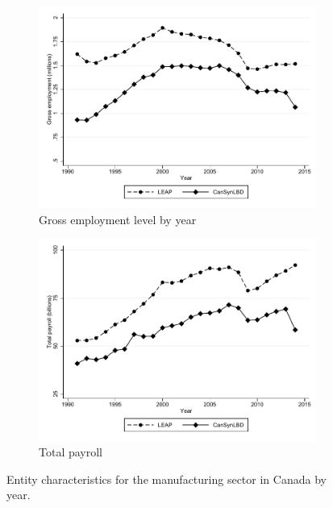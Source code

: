 \begin{figure}[H]
\centering
\begin{subfigure}[h]{0.48\linewidth}
\label{tab:Can:GrossEmploymentPrivate}
\includegraphics[width=\linewidth]{graphs/Gross_employment_level_by_year_manufacturing_bw.pdf} 
\caption{Gross employment level by year} \end{subfigure}
\hfill
\begin{subfigure}[h]{0.48\linewidth}
\includegraphics[width=\linewidth]{graphs/Total_payroll_by_year_manufacturing_bw.pdf}
\caption{Total payroll}
\end{subfigure}\caption{Entity characteristics for the manufacturing sector in Canada by year.}\label{fig:entity_chracteristics_manufac}
\end{figure}


